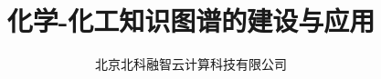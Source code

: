 
\title{化学-化工知识图谱的建设与应用}
\author[ ]{北京北科融智云计算科技有限公司}%
\renewcommand*{\Authfont}{\small\rm} %
\renewcommand*{\Affilfont}{\small\it} %
\renewcommand\Authands{ and } %
\renewcommand\Authands{ , } %
\date{} %



